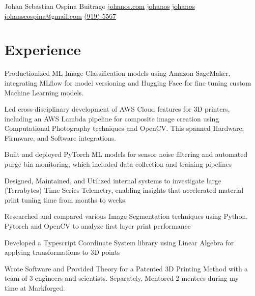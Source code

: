 \documentclass[]{plushcv}
\begin{document}
%
%
    
\namesection
{Johan Sebastian }
{Ospina Buitrago}
{}
{
    \contactline
    {\href{https://www.johanos.com}{johanos.com}}
    {\href{https://www.github.com/johanos}{johanos}}
    {\href{https://www.linkedin.com/in/johanos}
        {johanos}}
    {\href{mailto:johanseospina@gmail.com}{johanseospina@gmail.com}}
    {\href{tel:+1 (919) 946-5567}{(919)-5567}}
}

%
%

\begin{minipage}[t]{0.70\textwidth}



    \section{Experience}
    \vspace{\topsep} %
    \begin{tightemize}
        \sectionsep
        \item Productionized ML Image Classification models using Amazon SageMaker, integrating MLflow for model versioning and Hugging Face for fine tuning custom Machine Learning models.
        \item Led cross-disciplinary development of AWS Cloud features for 3D printers, including an AWS Lambda pipeline for composite image creation using Computational Photography techniques and OpenCV\@. This spanned Hardware, Firmware, and Software integrations.
        \item Built and deployed PyTorch ML models for sensor noise filtering and automated purge bin monitoring, which included data collection and training pipelines
        \item Designed, Maintained, and Utilized internal systems to investigate large (Terrabytes) Time Series Telemetry, enabling insights that accelerated material print tuning time from months to weeks
        \item Researched and compared various Image Segmentation techniques using Python, Pytorch and OpenCV to analyze first layer print performance
        \item Developed a Typescript Coordinate System library using Linear Algebra for applying transformations to 3D points
        \item Wrote Software and Provided Theory for a Patented 3D Printing Method with a team of 3 engineers and scientists. Separately, Mentored 2 mentees during my time at Markforged.
    \end{tightemize}
    \sectionsep


\end{minipage}
\end{document}
